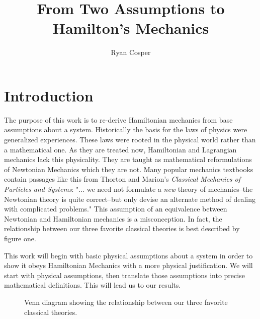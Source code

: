 \documentclass{article}
\title{From Two Assumptions to Hamilton's Mechanics}
\author{Ryan Cosper}
\begin{document}
\maketitle

\section{Introduction}

	The purpose of this work is to re-derive Hamiltonian mechanics from base assumptions about a system. Historically the basis for the laws of physics were generalized experiences. These laws were rooted in the physical world rather than a mathematical one. As they are treated now, Hamiltonian and Lagrangian mechanics lack this physicality. They are taught as mathematical reformulations of Newtonian Mechanics which they are not. Many popular mechanics textbooks contain passages like this from Thorton and Marion's \textit{Classical Mechanics of Particles and Systems}: "... we need not formulate a \textit{new} theory of mechanics--the Newtonian theory is quite correct--but only devise an alternate method of dealing with complicated problems\cite{thornton_marion_2014}." This assumption of an equivalence between Newtonian and Hamiltonian mechanics is a misconception. In fact, the relationship between our three favorite classical theories is best described by figure one.
	
	 This work will begin with basic physical assumptions about a system in order to show it obeys Hamiltonian Mechanics with a more physical justification. We will start with physical assumptions, then translate those assumptions into precise mathematical definitions. This will lead us to our results. 	
	 
\begin{figure}[!!ht]
\begin{center}
\end{center}
\caption{Venn diagram showing the relationship between our three favorite classical theories.}
\end{figure}
\end{document}
